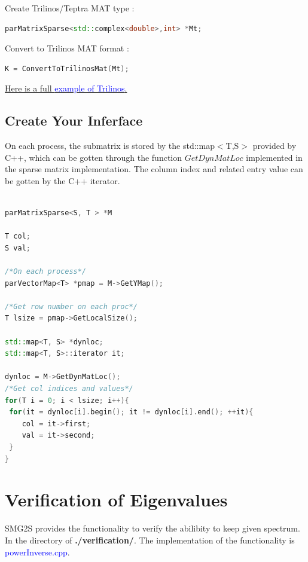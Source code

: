 \documentclass[a4paper, 10 pt]{report}
\begin{document}
	Create Trilinos/Teptra MAT type :
	\begin{lstlisting}[language=C++,frame=single]
   parMatrixSparse<std::complex<double>,int> *Mt;
	\end{lstlisting}

	Convert to Trilinos MAT format :
	\begin{lstlisting}[language=C++,frame=single]
   K = ConvertToTrilinosMat(Mt); 
	\end{lstlisting}

	\href{https://github.com/SMG2S/SMG2S/tree/master/example/teptra}{Here is a full \textcolor{blue}{ example of Trilinos}.}
	
	\section{Create Your Inferface}
	
	On each process, the submatrix is stored by the std::map$<$T,S$>$ provided by C++, which can be gotten through the function $GetDynMatLoc$ implemented in the sparse matrix implementation. The column index and related entry value can be gotten by the C++ iterator.
	
	\begin{lstlisting}[language=C++,frame=single]
	
parMatrixSparse<S, T > *M
	
T col;
S val;
	
/*On each process*/
parVectorMap<T> *pmap = M->GetYMap();
   
/*Get row number on each proc*/
T lsize = pmap->GetLocalSize(); 
   
std::map<T, S> *dynloc;
std::map<T, S>::iterator it;
   
dynloc = M->GetDynMatLoc();
/*Get col indices and values*/
for(T i = 0; i < lsize; i++){
 for(it = dynloc[i].begin(); it != dynloc[i].end(); ++it){
   	col = it->first;
   	val = it->second;
 }
}
	\end{lstlisting}
	\newpage

	\chapter{Verification of Eigenvalues}
	
	SMG2S provides the functionality to verify the abilibity to keep given spectrum. In the directory of \textbf{./verification/}. The implementation of the functionality is \textcolor{blue}{powerInverse.cpp}.
	
\end{document}
